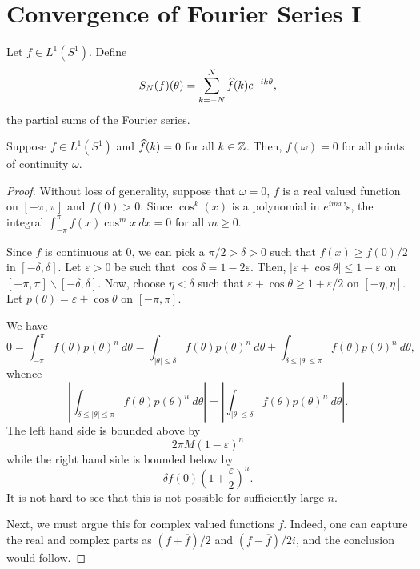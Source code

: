 \section{Convergence of Fourier Series I}

Let $f\in L^1(S^1)$. Define 
\begin{equation*}
    S_N(f)(\theta) = \sum_{k = -N}^N\widehat{f}(k)e^{-ik\theta},
\end{equation*}
the partial sums of the Fourier series.

\begin{theorem}
    Suppose $f\in L^1(S^1)$ and $\widehat{f}(k) = 0$ for all $k\in\mathbb{Z}$. Then, $f(\omega) = 0$ for all points of continuity $\omega$.
\end{theorem}
\begin{proof}
    Without loss of generality, suppose that $\omega = 0$, $f$ is a real valued function on $[-\pi,\pi]$ and $f(0) > 0$. Since $\cos^k(x)$ is a polynomial in $e^{imx}$'s, the integral $\int_{-\pi}^\pi f(x)\cos^mx~dx = 0$ for all $m\ge 0$.

    Since $f$ is continuous at $0$, we can pick a $\pi/2 > \delta > 0$ such that $f(x)\ge f(0)/2$ in $[-\delta, \delta]$. Let $\varepsilon > 0$ be such that $\cos\delta = 1 - 2\varepsilon$. Then, $|\varepsilon + \cos\theta|\le 1 - \varepsilon$ on $[-\pi, \pi]\backslash[-\delta,\delta]$. Now, choose $\eta < \delta$ such that $\varepsilon + \cos\theta\ge 1 + \varepsilon/2$ on $[-\eta,\eta]$. Let $p(\theta) = \varepsilon + \cos\theta$ on $[-\pi, \pi]$. 

    We have 
    \begin{equation*}
        0 = \int_{-\pi}^\pi f(\theta) p(\theta)^n~d\theta = \int_{|\theta|\le\delta} f(\theta)p(\theta)^n~d\theta + \int_{\delta\le|\theta|\le\pi}f(\theta)p(\theta)^n~d\theta,
    \end{equation*}
    whence 
    \begin{equation*}
        \left|\int_{\delta\le |\theta|\le\pi}f(\theta)p(\theta)^n~d\theta\right| = \left|\int_{|\theta|\le\delta}f(\theta)p(\theta)^n~d\theta\right|.
    \end{equation*}
    The left hand side is bounded above by 
    \begin{equation*}
        2\pi M(1 - \varepsilon)^n
    \end{equation*}
    while the right hand side is bounded below by 
    \begin{equation*}
        \delta f(0)\left(1 + \frac{\varepsilon}{2}\right)^n.
    \end{equation*}
    It is not hard to see that this is not possible for sufficiently large $n$.

    Next, we must argue this for complex valued functions $f$. Indeed, one can capture the real and complex parts as $(f + \overline f)/2$ and $(f - \overline f)/2i$, and the conclusion would follow.
\end{proof}

